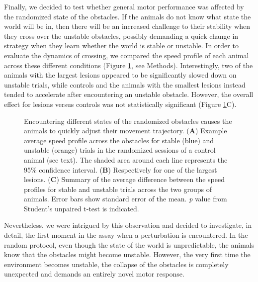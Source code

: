 Finally, we decided to test whether general motor performance was affected by the randomized state of the obstacles. If the animals do not know what state the world will be in, then there will be an increased challenge to their stability when they cross over the unstable obstacles, possibly demanding a quick change in strategy when they learn whether the world is stable or unstable. In order to evaluate the dynamics of crossing, we compared the speed profile of each animal across these different conditions (Figure \ref{fig:speed}, see Methods). Interestingly, two of the animals with the largest lesions appeared to be significantly slowed down on unstable trials, while controls and the animals with the smallest lesions instead tended to accelerate after encountering an unstable obstacle. However, the overall effect for lesions versus controls was not statistically significant (Figure \ref{fig:speed}C).

\begin{figure}
\centering

\caption{Encountering different states of the randomized obstacles causes the animals to quickly adjust their movement trajectory. (\textbf{A}) Example average speed profile across the obstacles for stable (blue) and unstable (orange) trials in the randomized sessions of a control animal (see text). The shaded area around each line represents the 95\% confidence interval. (\textbf{B}) Respectively for one of the largest lesions. (\textbf{C}) Summary of the average difference between the speed profiles for stable and unstable trials across the two groups of animals. Error bars show standard error of the mean. \emph{p} value from Student's unpaired t-test is indicated.}
\label{fig:speed}
\end{figure}

Nevertheless, we were intrigued by this observation and decided to investigate, in detail, the first moment in the assay when a perturbation is encountered. In the random protocol, even though the state of the world is unpredictable, the animals know that the obstacles might become unstable. However, the very first time the environment becomes unstable, the collapse of the obstacles is completely unexpected and demands an entirely novel motor response.

